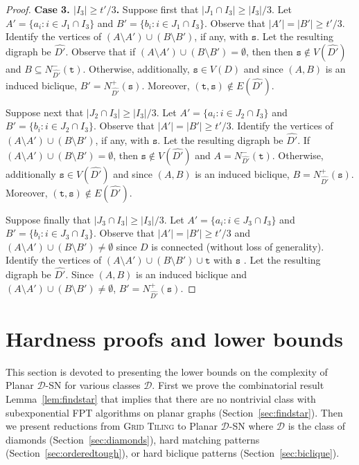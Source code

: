 \documentclass[a4paper,11pt]{article}
\newcommand{\calD}{\mathcal{D}}
\theoremstyle{plain}
\newtheorem{identification rule}{Identification Rule}
\theoremstyle{definition}
\theoremstyle{remark}
\newcommand{\Dsn}{{\sc Planar $\calD$-SN}\xspace}
\newcommand{\sss}{\texttt{s}}
\newcommand{\ttt}{\texttt{t}}
\begin{document}
\begin{proof}
\noindent
{\bf Case 3. $|I_3| \geq t'/3$.} Suppose first that $|J_1 \cap I_3| \geq |I_3|/3$. Let $A' =\{a_i:  i \in J_1 \cap I_3\}$ and $B' =\{b_i:  i \in J_1 \cap I_3\}$. Observe that $|A'|=|B'| \geq t'/3$.
Identify the vertices of $(A\setminus A') \cup (B \setminus B')$, if any, with $\sss$. Let the resulting digraph be  $\widehat{D'}$. Observe that if $(A\setminus A') \cup (B \setminus B') =\emptyset$, then then $\sss \not \in V(\widehat{D'})$ and $B \subseteq N^-_{\widehat{D'}}(\ttt)$. Otherwise, additionally, $\sss \in V(D)$ and since $(A,B)$ is an induced biclique, $B'=N^+_{\widehat{D'}}(\sss)$. Moreover, $(\ttt,\sss) \not \in E(\widehat{D'})$.

Suppose next that $|J_2 \cap I_3| \geq |I_3|/3$. Let $A' =\{a_i:  i \in J_2 \cap I_3\}$ and $B' =\{b_i:  i \in J_2 \cap I_3\}$. Observe that $|A'|=|B'| \geq t'/3$.
Identify the vertices of $(A\setminus A') \cup (B \setminus B')$, if any,  with $\sss$. Let the resulting digraph be  $\widehat{D'}$. If $(A\setminus A') \cup (B \setminus B') =\emptyset$, then $\sss \not \in V(\widehat{D'})$ and $A = N^-_{\widehat{D'}}(\ttt)$. Otherwise, additionally $\sss \in V(\widehat{D'})$ and since $(A,B)$ is an induced biclique, $B= N^+_{\widehat{D'}}(\sss)$. Moreover, $(\ttt,\sss) \not \in E(\widehat{D'})$.
  
Suppose finally that $|J_3 \cap I_3| \geq |I_3|/3$. Let $A' =\{a_i: i \in J_3 \cap I_3\}$ and $B' =\{b_i: i \in J_3 \cap I_3\}$. Observe that $|A'|=|B'| \geq t'/3$ and $(A\setminus A') \cup (B \setminus B') \neq \emptyset$ since $D$ is connected (without loss of generality).
Identify the vertices of $(A\setminus A') \cup (B \setminus B') \cup \ttt$ with $\sss$ . Let the resulting digraph be $\widehat{D'}$. Since $(A,B)$ is an induced biclique and $(A\setminus A') \cup (B \setminus B') \neq \emptyset$, 
 $B' = N^+_{\widehat{D'}}(\sss)$. 
\end{proof}
\section{Hardness proofs and lower bounds}\label{sec:lower}

This section is devoted to presenting the lower bounds on the complexity of \Dsn for various classes $\calD$. First we prove the combinatorial result Lemma~\ref{lem:findstar} that implies that there are no nontrivial class with subexponential FPT algorithms on planar graphs (Section~\ref{sec:findstar}). Then we present reductions from \textsc{Grid Tiling} to \Dsn where $\calD$ is the class of diamonds (Section~\ref{sec:diamonds}), hard matching patterns (Section~\ref{sec:orderedtough}), or hard biclique patterns (Section~\ref{sec:biclique}).
\end{document}
